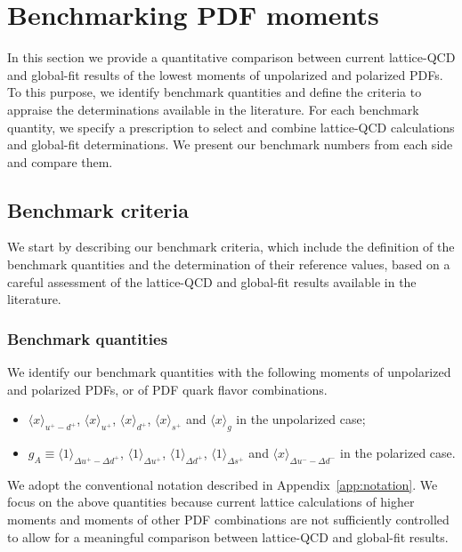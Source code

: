 \section{Benchmarking PDF moments}
\label{sec:benchmarking}

In this section we provide a quantitative comparison between 
current lattice-QCD and global-fit results of the lowest
moments of unpolarized and polarized PDFs.
%
To this purpose, we identify benchmark quantities
and define the criteria to appraise the determinations
available in the literature.
%
For each benchmark quantity, we specify a prescription to 
select and combine lattice-QCD calculations and global-fit determinations.
%
We present our benchmark numbers from each side and compare them.

\subsection{Benchmark criteria}
\label{subsec:BC}

We start by describing our benchmark criteria, which include the definition
of the benchmark quantities and the determination of their reference values,
based on a careful assessment of the lattice-QCD and global-fit results 
available in the literature.

\subsubsection{Benchmark quantities}
\label{subsubsec:BQ}

We identify our benchmark quantities with the following moments of unpolarized 
and polarized PDFs, or of PDF quark flavor combinations.
\begin{itemize}
  \item
$\langle x\rangle_{u^+-d^+}$, $\langle x \rangle_{u^+}$, $\langle x \rangle_{d^+}$, 
$\langle x \rangle_{s^+}$ and $\langle x \rangle_{g}$ in the unpolarized case; 
\item $g_A\equiv\langle 1 \rangle_{\Delta u^+ - \Delta d ^+}$, 
$\langle 1 \rangle_{\Delta u^+}$, $\langle 1 \rangle_{\Delta d^+}$,  
$\langle 1 \rangle_{\Delta s^+}$ and $\langle x \rangle_{\Delta u^- - \Delta d^-}$ 
  in the polarized case.
  \end{itemize}
%
We adopt the conventional notation described in Appendix~\ref{app:notation}.
%
We focus on the above quantities because current lattice 
calculations of higher moments and moments of other PDF 
combinations are not sufficiently controlled to allow for a meaningful 
comparison between lattice-QCD and global-fit results. 

